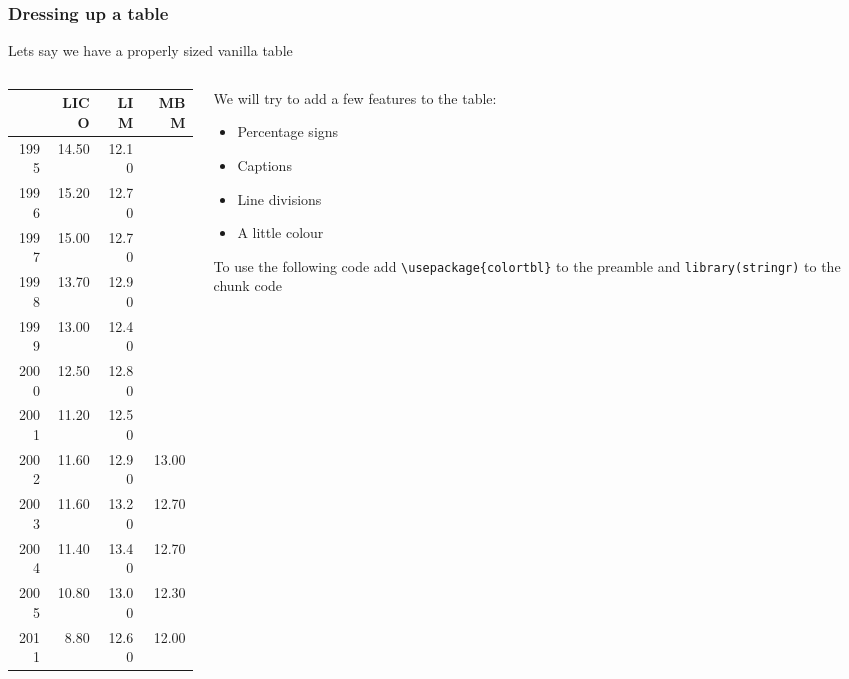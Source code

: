 \documentclass[nogin]{beamer}\usepackage[]{graphicx}\usepackage[]{color}
\begin{document}
\begin{frame}[fragile]
\small
\frametitle{Dressing up a table}
Lets say we have a properly sized vanilla table
\begin{columns}[T]
\begin{column}{0.5\textwidth}
\begin{table}[ht]
\centering
\begin{tabular}{rrrr}
  \hline
 & LICO & LIM & MBM \\ 
  \hline
1995 & 14.50 & 12.10 &  \\ 
  1996 & 15.20 & 12.70 &  \\ 
  1997 & 15.00 & 12.70 &  \\ 
  1998 & 13.70 & 12.90 &  \\ 
  1999 & 13.00 & 12.40 &  \\ 
  2000 & 12.50 & 12.80 &  \\ 
  2001 & 11.20 & 12.50 &  \\ 
  2002 & 11.60 & 12.90 & 13.00 \\ 
  2003 & 11.60 & 13.20 & 12.70 \\ 
  2004 & 11.40 & 13.40 & 12.70 \\ 
  2005 & 10.80 & 13.00 & 12.30 \\ 
  2011 & 8.80 & 12.60 & 12.00 \\ 
   \hline
\end{tabular}
\end{table}


\end{column}
\begin{column}{0.45\textwidth}
We will try to add a few features to the table:
\begin{itemize}
\item Percentage signs
\item Captions
\item Line divisions
\item A little colour
\end{itemize}
To use the following code add \verb|\usepackage{colortbl}| to the preamble and \verb|library(stringr)| to the chunk code
\end{column}
\end{columns}
\end{frame}
\end{document}
